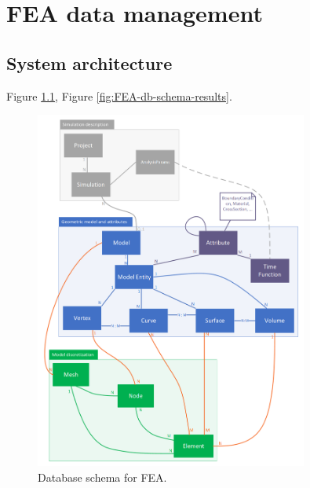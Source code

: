 \chapter{FEA data management}
\label{chapter:data-management}




\section{System architecture}
\label{sec:system-architecture}


Figure \ref{fig:FEA-db-schema}, Figure \ref{fig:FEA-db-schema-results}.

\begin{figure}[H]
    \centering
    \includegraphics[width=0.8\textwidth]{figures/FEA-database-schema}
    \decoRule
    \caption{Database schema for FEA.}
    \label{fig:FEA-db-schema}
\end{figure}

